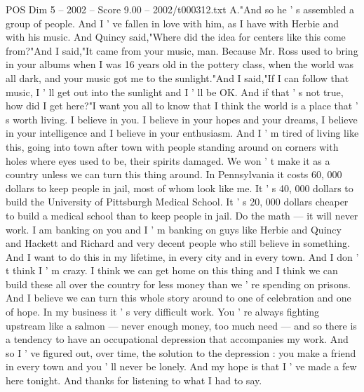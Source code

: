 \begin{textsample}{POS Dim 5 – 2002 – Score 9.00 – 2002/t000312.txt}
A."And so he ' s assembled a group of people.
And I ' ve fallen in love with him, as I have with Herbie and with his music.
And Quincy said,"Where did the idea for centers like this come from?"And I said,"It came from your music, man.
Because Mr.
Ross used to bring in your albums when I was 16 years old in the pottery class, when the world was all dark, and your music got me to the sunlight."And I said,"If I can follow that music, I ' ll get out into the sunlight and I ' ll be OK.
And if that ' s not true, how did I get here?"I want you all to know that I think the world is a place that ' s worth living.
I believe in you.
I believe in your hopes and your dreams, I believe in your intelligence and I believe in your enthusiasm.
And I ' m tired of living like this, going into town after town with people standing around on corners with holes where eyes used to be, their spirits damaged.
We won ' t make it as a country unless we can turn this thing around.
In Pennsylvania it costs 60, 000 dollars to keep people in jail, most of whom look like me.
It ' s 40, 000 dollars to build the University of Pittsburgh Medical School.
It ' s 20, 000 dollars cheaper to build a medical school than to keep people in jail.
Do the math — it will never work.
I am banking on you and I ' m banking on guys like Herbie and Quincy and Hackett and Richard and very decent people who still believe in something.
And I want to do this in my lifetime, in every city and in every town.
And I don ' t think I ' m crazy.
I think we can get home on this thing and I think we can build these all over the country for less money than we ' re spending on prisons.
And I believe we can turn this whole story around to one of celebration and one of hope.
In my business it ' s very difficult work.
You ' re always fighting upstream like a salmon — never enough money, too much need — and so there is a tendency to have an occupational depression that accompanies my work.
And so I ' ve figured out, over time, the solution to the depression : you make a friend in every town and you ' ll never be lonely.
And my hope is that I ' ve made a few here tonight.
And thanks for listening to what I had to say.

\end{textsample}
